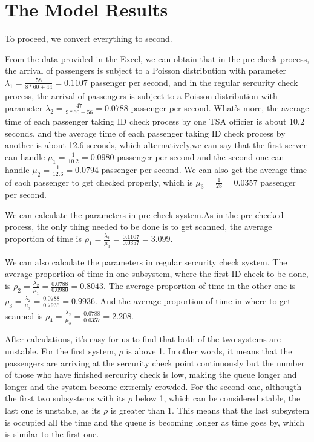 \documentclass{mcmthesis}
\begin{document}
\section{The Model Results}%
	To proceed, we convert everything to second.

	From the data provided in the Excel, we can obtain that in the pre-check process, the arrival of passengers is subject to a Poisson distribution with parameter ${\lambda_1 = \frac {58}{ 8 *60 + 44 } = 0.1107}$ passenger per second, and in the regular sercurity check process, the arrival of passengers is subject to a Poisson distribution with parameter ${\lambda_2 = \frac {47}{9 *60 + 56} = 0.0788}$ passenger per second. What's more, the average time of each passenger taking ID check process by one TSA officier is about 10.2 seconds, and the average time of each passenger taking ID check process by another is about 12.6 seconds, which alternatively,we can say that the first server can handle ${\mu_1 = \frac {1}{10.2} = 0.0980}$ passenger per second and the second one can handle ${\mu_2 = \frac {1}{12.6} = 0.0794}$ passenger per second. We can also get the average time of each passenger to get checked properly, which is ${\mu_3 = \frac{1}{28} = 0.0357}$ passenger per second.

	We can calculate the parameters in pre-check system.As in the pre-checked process, the only thing needed to be done is to get scanned, the average proportion of time is ${\rho_1 = \frac {\lambda_1}{\mu_3} = \frac {0.1107}{0.0357} = 3.099}$. 
	
	We can also calculate the parameters in regular sercurity check system. The average proportion of time in one subsystem, where the first ID check to be done, is ${\rho_2 = \frac{\lambda_2}{\mu_1} = \frac {0.0788}{0.0980} = 0.8043}$. The average proportion of time in the other one is ${\rho_3= \frac{\lambda_2}{\mu_2} = \frac {0.0788}{0.7936} = 0.9936}$. And the average proportion of time in where to get scanned is ${\rho_4 = \frac{\lambda_2}{\mu_3} = \frac {0.0788}{0.0357} = 2.208}$.
	
	After calculations, it's easy for us to find that both of the two systems are unstable. For the first system,  ${\rho}$ is above 1.  In other words, it means that the passengers are arriving at the sercurity check point continuously but the number of those who have finished sercurity check is low, making the queue longer and longer and the system become extremly crowded. For the second one, althougth the first two subsystems with its ${\rho}$ below 1, which can be considered stable, the last one is unstable, as its ${\rho}$ is greater than 1. This means that the last subsystem is occupied all the time and the queue is becoming longer as time goes by, which is similar to the first one.
\end{document}
